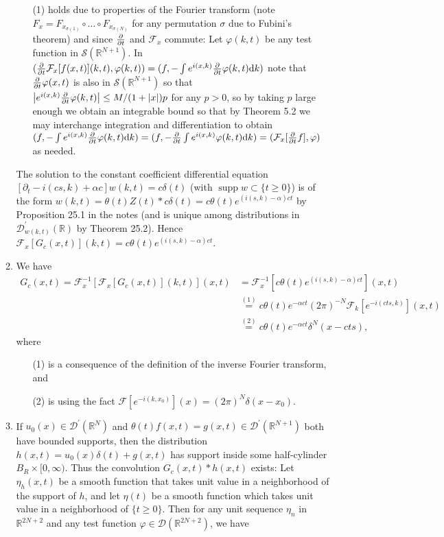 \documentclass[11pt]{article}
\newcommand{\eq}[1]{\overset{(#1)}{=}}
\DeclareMathOperator{\supp}{supp}
\begin{document}
\begin{enumerate}
\begin{enumerate}[label=(\roman*)]
\begin{enumerate}
            \item[(1)] holds due to properties of the Fourier transform (note $F_x = F_{x_{\sigma(1)}}\circ\dots\circ F_{x_{\sigma(N)}}$ for any permutation $\sigma$ due to Fubini's theorem) and since $\pdv t$ and $\mathcal F_x$ commute: Let $\varphi(k,t)$ be any test function in $\mathcal S(\mathbb R^{N+1})$. In $(\pdv t \mathcal F_x[f(x,t)](k,t),\varphi(k,t)) = (f,- \int e^{i(x,k)}\pdv t\varphi(k,t)\dd k)$ note that $\pdv t\varphi(x,t)$ is also in $\mathcal S(\mathbb R^{N+1})$ so that $\abs{e^{i(x,k)}\pdv t\varphi(k,t)}\leq M/(1+\abs{x})p$ for any $p>0$, so by taking $p$ large enough we obtain an integrable bound so that by Theorem 5.2 we may interchange integration and differentiation to obtain $(f,- \int e^{i(x,k)}\pdv t\varphi(k,t)\dd k) = (f,-\pdv t\int e^{i(x,k)}\varphi(k,t)\dd k) = (\mathcal F_x[\pdv t f],\varphi)$ as needed.
        \end{enumerate}
        The solution to the constant coefficient differential equation $[\partial_t-i(cs,k)+\alpha c]w(k,t) = c\delta(t)$ (with $\supp w \subset \{t\geq 0\}$) is of the form $w(k,t) = \theta(t)Z(t)\ast c\delta(t) = c\theta(t)e^{(i(s,k)-\alpha)ct}$ by Proposition 25.1 in the notes (and is unique among distributions in $\mathcal D^\prime_{w(k,t)}(\mathbb R)$ by Theorem 25.2). Hence $\mathcal F_x[G_c(x,t)](k,t)=c\theta(t)e^{(i(s,k)-\alpha)ct}$.
        \item We have
        \begin{align*}
            G_c(x,t) = \mathcal F^{-1}_x[\mathcal F_x[G_c(x,t)](k,t)](x,t) &= \mathcal F^{-1}_x[c\theta(t)e^{(i(s,k)-\alpha)ct}](x,t) \\
            &\eq{1} c\theta(t)e^{-\alpha ct}(2\pi)^{-N}\mathcal F_k[e^{-i(cts,k)}](x,t)\\
            &\eq{2} c\theta(t)e^{-\alpha ct}\delta^N(x-cts),
        \end{align*} where\begin{enumerate}
            \item[(1)] is a consequence of the definition of the inverse Fourier transform, and
            \item[(2)] is using the fact $\mathcal F[e^{-i(k,x_0)}](x) = (2\pi)^N\delta(x-x_0)$.
        \end{enumerate}
        \item If $u_0(x)\in\mathcal D^\prime(\mathbb R^N)$ and $\theta(t)f(x,t) = g(x,t)\in \mathcal D^\prime(\mathbb R^{N+1})$ both have bounded supports, then the distribution $h(x,t) = u_0(x)\delta(t) + g(x,t)$ has support inside some half-cylinder $B_R\times [0,\infty)$. Thus the convolution $G_c(x,t)\ast h(x,t)$ exists: Let $\eta_h(x,t)$ be a smooth function that takes unit value in a neighborhood of the support of $h$, and let $\eta(t)$ be a smooth function which takes unit value in a neighborhood of $\{t\geq 0\}$. Then for any unit sequence $\eta_n$ in $\mathbb R^{2N+2}$ and any test function $\varphi\in\mathcal D(\mathbb R^{2N+2})$, we have 

\end{enumerate}
\end{enumerate}
\end{document}

